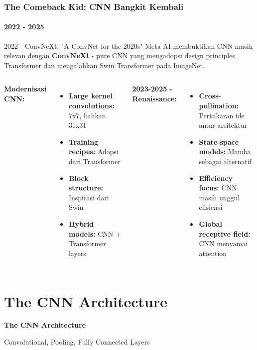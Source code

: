 \documentclass[t,aspectratio=169,xcolor=dvipsnames]{beamer}
\begin{document}
\begin{frame}
    \frametitle{The Comeback Kid: CNN Bangkit Kembali}
    \framesubtitle{2022 - 2025}
    \footnotesize

    \begin{exampleblock}{2022 - ConvNeXt: "A ConvNet for the 2020s"}
        Meta AI membuktikan CNN masih relevan dengan \textbf{ConvNeXt} - pure CNN yang mengadopsi design principles Transformer dan mengalahkan Swin Transformer pada ImageNet.
    \end{exampleblock}

    \begin{columns}[t]
        \textbf{Modernisasi CNN:}
        \begin{itemize}
            \item \textbf{Large kernel convolutions:} 7x7, bahkan 31x31
            \item \textbf{Training recipes:} Adopsi dari Transformer
            \item \textbf{Block structure:} Inspirasi dari Swin
            \item \textbf{Hybrid models:} CNN + Transformer layers
        \end{itemize}

        \textbf{2023-2025 - Renaissance:}
        \begin{itemize}
            \item \textbf{Cross-pollination:} Pertukaran ide antar arsitektur
            \item \textbf{State-space models:} Mamba sebagai alternatif
            \item \textbf{Efficiency focus:} CNN masih unggul efisiensi
            \item \textbf{Global receptive field:} CNN menyamai attention
        \end{itemize}
    \end{columns}
\end{frame}

\section{The CNN Architecture}

\begin{frame}[plain]
    \begin{center}
        \vspace{3cm}
        {\Huge \textbf{The CNN Architecture}}
        \vspace{0.5cm}
        
        {\large Convolutional, Pooling, Fully Connected Layers}
    \end{center}
\end{frame}
\end{document}
